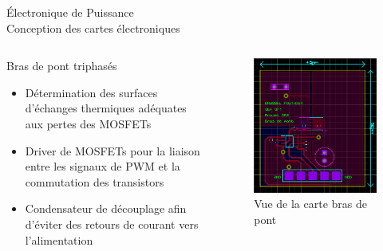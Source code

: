 \documentclass{beamer}
\begin{document}
	\begin{frame}{Électronique de Puissance\\ Conception des cartes électroniques}
		\begin{columns}[T]
	  		\begin{column}{0.6\textwidth}
	  			Bras de pont triphasés
		    	\begin{itemize}
		    		\item Détermination des surfaces d'échanges thermiques adéquates aux pertes des MOSFETs
		    		\item Driver de MOSFETs pour la liaison entre les signaux de PWM et la commutation des transistors
		    		\item Condensateur de découplage afin d'éviter des retours de courant vers l'alimentation
		    	\end{itemize}
	  		\end{column}
	  		\begin{column}{0.4\textwidth}
	  			\begin{figure}
	  				\begin{center}
	  					\includegraphics[height=0.5\textheight]{../Illus/PCB_Bras_de_pont.PNG}
	  				\end{center}
	    			\caption{Vue de la carte bras de pont}
	    		\end{figure}
	  		\end{column}
		\end{columns}
	\end{frame}
	
\end{document}
